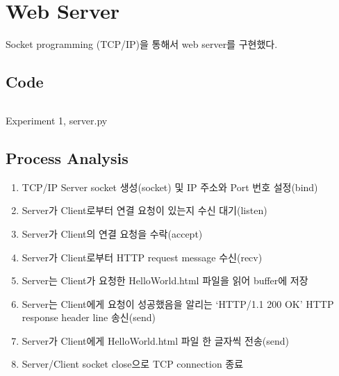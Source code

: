 \section{Web Server}
Socket programming (TCP/IP)을 통해서 web server를 구현했다.

\subsection{Code}
\vspace{-4mm}
\begin{listing}[h!]
\inputminted[framerule = 1pt,framesep = 2mm , frame = lines, fontsize=\footnotesize]{python}{./code/week09/01/server.py}
\caption{\footnotesize Experiment 1, server.py}
\end{listing}
\clearpage

\subsection{Process Analysis}
\begin{enumerate}
    \item TCP/IP Server socket 생성(socket) 및 IP 주소와 Port 번호 설정(bind)
    \item Server가 Client로부터 연결 요청이 있는지 수신 대기(listen)
    \item Server가 Client의 연결 요청을 수락(accept)
    \item Server가 Client로부터 HTTP request message 수신(recv)
    \item Server는 Client가 요청한 HelloWorld.html 파일을 읽어 buffer에 저장
    \item Server는 Client에게 요청이 성공했음을 알리는 ‘HTTP/1.1 200 OK’ HTTP response header line 송신(send)
    \item Server가 Client에게 HelloWorld.html 파일 한 글자씩 전송(send)
    \item Server/Client socket close으로 TCP connection 종료
\end{enumerate}


